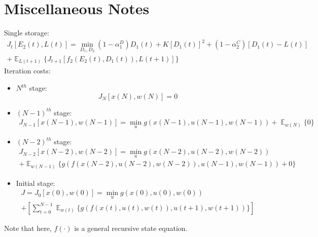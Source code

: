 \documentclass{article}
\DeclareMathOperator{\E}{\mathbb{E}}
\begin{document}
	\section{Miscellaneous Notes}
	Single storage:
	\begin{multline}
	J_{t}[E_{2}(t),L(t)] = \min_{D_{1},D_{2}}
	(1-\alpha_{1}^{D})D_{1}(t) 
	+ K[D_{1}(t)]^{2}
	+(1-\alpha_{2}^{C})[D_{1}(t)-L(t)]\\
	+\mathop{\E}_{L(t+1)} \{J_{t+1}[f_{2}(E_{2}(t),D_{1}(t)),L(t+1)]\}
	\end{multline}
	Iteration costs:
	\begin{itemize}
	\item $N^{th}$ stage: \\
	\begin{equation}
	J_{N}[x(N),w(N)]=0
	\end{equation}
	
	\item $(N-1)^{th}$ stage: \\
	\begin{multline}
	J_{N-1}[x(N-1),w(N-1)]=\min_{u} g(x(N-1),u(N-1),w(N-1))+ \mathop{\E}_{w(N)}\{0\}
	\end{multline}
	
	\item $(N-2)^{th}$ stage: \\
	\begin{multline}
	J_{N-2}[x(N-2),w(N-2)]=\min_{u} g(x(N-2),u(N-2),w(N-2))\\
	+ \mathop{\E}_{w(N-1)} \{
	g( f(x(N-2),u(N-2),w(N-2)) ,u(N-1),w(N-1))+0\}
	\end{multline}
	
	\item Initial stage: \\	
	\begin{multline}
	J=J_{0}[x(0),w(0)]=\min_{u} g(x(0),u(0),w(0))\\
	+\left[\sum_{t=0}^{N-1}\mathop{\E}_{w(t)} \{
	g( f(x(t),u(t),w(t)) ,u(t+1),w(t+1))
	\}\right]
	\end{multline}
	\end{itemize}

	Note that here, $f(\cdot)$ is a general recursive state equation.
	
	
	
	
\end{document}
